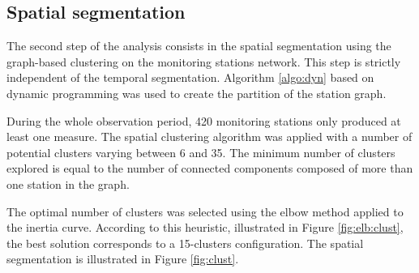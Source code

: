 


\subsection{Spatial segmentation}\label{section:clust129}

The second step of the analysis consists in the spatial segmentation using the graph-based clustering on the monitoring stations network. This step is strictly independent of the temporal segmentation. Algorithm \ref{algo:dyn} based on dynamic programming was used to create the partition of the station graph.


During the whole observation period, 420 monitoring stations only produced at least one measure. The spatial clustering algorithm was applied with a number of potential clusters varying between 6 and 35. The minimum number of clusters explored is equal to the number of connected components composed of more than one station in the graph. 

The optimal number of clusters was selected using the elbow method applied to the inertia curve. According to this heuristic, illustrated in Figure \ref{fig:elb:clust}, the best solution corresponds to a 15-clusters configuration. The spatial segmentation is illustrated in Figure \ref{fig:clust}.

